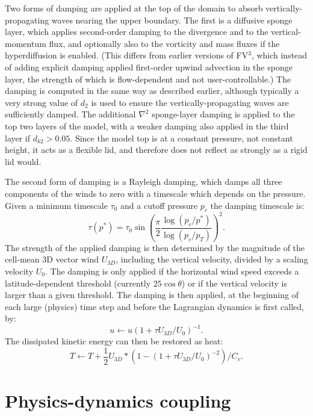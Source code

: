 \documentclass[12pt,letterpaper]{book}
\newcommand{\fv}{FV$^{\mathrm{3}}$}
\begin{document}
Two forms of damping are applied at the top of the domain to absorb vertically-propagating waves nearing the upper boundary. The first is a diffusive sponge layer, which applies second-order damping to the divergence and to the vertical-momentum flux, and optionally also to the vorticity and mass fluxes if the hyperdiffusion is enabled. (This differs from earlier versions of \fv, which instead of adding explicit damping applied first-order upwind advection in the sponge layer, the strength of which is flow-dependent and not user-controllable.)  The damping is computed in the same way as described earlier, although typically a very strong value of $d_2$ is used to ensure the vertically-propagating waves are sufficiently damped. The additional $\nabla^2$ sponge-layer damping is applied to the top two layers of the model, with a weaker damping also applied in the third layer if $d_{k2} > 0.05$. Since the model top is at a constant pressure, not constant height, it acts as a flexible lid, and therefore does not reflect as strongly as a rigid lid would.

The second form of damping is a Rayleigh damping, which damps all three components of the winds to zero with a timescale which depends on the pressure. Given a minimum timescale $\tau_0$ and a cutoff pressure $p_c$ the damping timescale is:
\begin{equation}
\tau \left(p^*\right) = \tau_0 \sin \left ( \frac{\pi}{2} \frac{\log(p_c/p^*) }{\log(p_c/p_T)} \right )^2 .
\end{equation}
The strength of the applied damping is then determined by the magnitude of the cell-mean 3D vector wind $U_{3D}$, including the vertical velocity, divided by a scaling velocity $U_0$. The damping is only applied if the horizontal wind speed exceeds a latitude-dependent threshold (currently $25\cos \theta$) or if the vertical velocity is larger than a given threshold. The damping is then applied, at the beginning of each large (physics) time step and before the Lagrangian dynamics is first called, by:
\begin{equation}
u \leftarrow u \left ( 1 + \tau U_{3D}/U_0  \right )^{-1}.
\end{equation}
The dissipated kinetic energy can then be restored as heat:
\begin{equation}
T \leftarrow T + \frac{1}{2} U_{3D}* \left ( 1 - \left ( 1 + \tau U_{3D}/U_0 \right )^{-2} \right )  / C_v.
\end{equation}

\chapter{Physics-dynamics coupling} \label{chap:PDcoupling}
\end{document}
